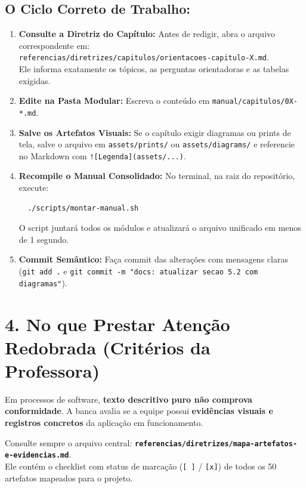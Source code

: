 \documentclass[11pt,a4paper]{article}
\begin{document}
\subsection*{O Ciclo Correto de Trabalho:}
\begin{enumerate}
  \item \textbf{Consulte a Diretriz do Capítulo:} Antes de redigir, abra o arquivo correspondente em: \\
  \texttt{referencias/diretrizes/capitulos/orientacoes-capitulo-X.md}. \\
  Ele informa exatamente os tópicos, as perguntas orientadoras e as tabelas exigidas.
  \item \textbf{Edite na Pasta Modular:} Escreva o conteúdo em \texttt{manual/capitulos/0X-*.md}.
  \item \textbf{Salve os Artefatos Visuais:} Se o capítulo exigir diagramas ou prints de tela, salve o arquivo em \texttt{assets/prints/} ou \texttt{assets/diagrams/} e referencie no Markdown com \texttt{![Legenda](assets/...)}.
  \item \textbf{Recompile o Manual Consolidado:} No terminal, na raiz do repositório, execute:
  \begin{verbatim}
  ./scripts/montar-manual.sh
  \end{verbatim}
  O script juntará todos os módulos e atualizará o arquivo unificado em menos de 1 segundo.
  \item \textbf{Commit Semântico:} Faça commit das alterações com mensagens claras (\texttt{git add .} e \texttt{git commit -m "docs: atualizar secao 5.2 com diagramas"}).
\end{enumerate}

\newpage

\section{4. No que Prestar Atenção Redobrada (Critérios da Professora)}
Em processos de software, \textbf{texto descritivo puro não comprova conformidade}. A banca avalia se a equipe possui \textbf{evidências visuais e registros concretos} da aplicação em funcionamento.

\begin{dicaPratica}
Consulte sempre o arquivo central: \textbf{\texttt{referencias/diretrizes/mapa-artefatos-e-evidencias.md}}. \\
Ele contém o checklist com status de marcação (\texttt{[ ]} / \texttt{[x]}) de todos os 50 artefatos mapeados para o projeto.
\end{dicaPratica}
\end{document}
